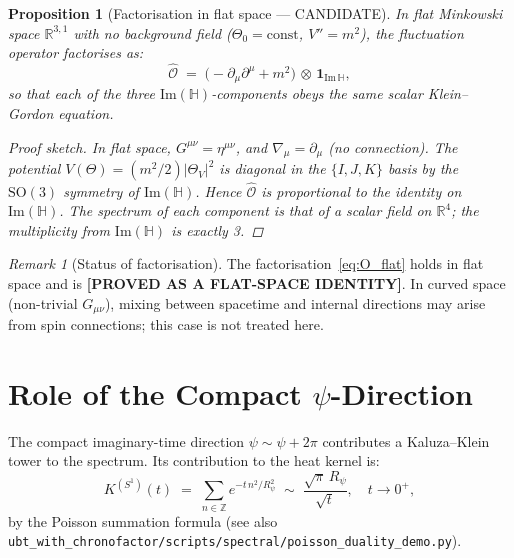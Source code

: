 \documentclass[11pt,a4paper]{article}
\newtheorem{proposition}{Proposition}
\theoremstyle{definition}
\theoremstyle{remark}
\newtheorem{remark}{Remark}
\begin{document}
\begin{proposition}[Factorisation in flat space — CANDIDATE]
\label{prop:factorise}
  In flat Minkowski space $\mathbb{R}^{3,1}$ with no background field
  ($\Theta_0 = \mathrm{const}$, $V'' = m^2$), the fluctuation operator
  factorises as:
  \begin{equation}
    \hat{\mathcal{O}}
    \;=\; \bigl(-\partial_\mu\partial^\mu + m^2\bigr)
      \,\otimes\,
      \mathbf{1}_{\mathrm{Im}\,\mathbb{H}},
    \label{eq:O_flat}
  \end{equation}
  so that each of the three $\mathrm{Im}(\mathbb{H})$-components obeys
  the same scalar Klein–Gordon equation.

  \begin{proof}[Proof sketch]
    In flat space, $G^{\mu\nu} = \eta^{\mu\nu}$, and
    $\nabla_\mu = \partial_\mu$ (no connection).
    The potential $V(\Theta) = (m^2/2)|\Theta_V|^2$ is diagonal in the
    $\{I,J,K\}$ basis by the $\mathrm{SO}(3)$ symmetry of $\mathrm{Im}(\mathbb{H})$.
    Hence $\hat{\mathcal{O}}$ is proportional to the identity on
    $\mathrm{Im}(\mathbb{H})$.
    The spectrum of each component is that of a scalar field on $\mathbb{R}^4$;
    the multiplicity from $\mathrm{Im}(\mathbb{H})$ is exactly 3.
  \end{proof}
\end{proposition}

\begin{remark}[Status of factorisation]
  The factorisation~\eqref{eq:O_flat} holds in flat space and is
  \textbf{[PROVED AS A FLAT-SPACE IDENTITY]}.
  In curved space (non-trivial $G_{\mu\nu}$), mixing between spacetime and
  internal directions may arise from spin connections; this case is not
  treated here.
\end{remark}

\section{Role of the Compact $\psi$-Direction}
\label{sec:compact_psi}

The compact imaginary-time direction $\psi \sim \psi + 2\pi$ contributes
a Kaluza–Klein tower to the spectrum.
Its contribution to the heat kernel is:
\begin{equation}
  K^{(S^1)}(t) \;=\; \sum_{n \in \mathbb{Z}} e^{-t\,n^2/R_\psi^2}
  \;\sim\; \frac{\sqrt{\pi}\,R_\psi}{\sqrt{t}}, \quad t \to 0^+,
  \label{eq:K_S1}
\end{equation}
by the Poisson summation formula (see also
\texttt{ubt\_with\_chronofactor/scripts/spectral/poisson\_duality\_demo.py}).
\end{document}
